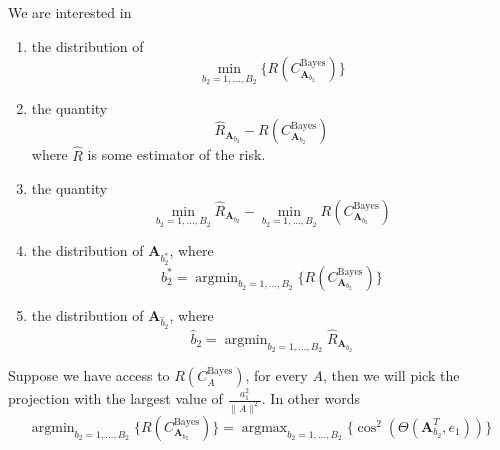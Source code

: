 \documentclass[12pt]{article}
\DeclareMathOperator*{\argmin}{argmin}
\DeclareMathOperator*{\argmax}{argmax}
\begin{document}
We are interested in 
\begin{enumerate} 
\item the distribution of 
\[
\min_{b_2 = 1, \ldots, B_2} \{ R(C_{\mathbf{A}_{b_2}}^{\mathrm{Bayes}})\} 
\]
\item the quantity
\[
\hat{R}_{\mathbf{A}_{b_2}} - R(C_{\mathbf{A}_{b_2}}^{\mathrm{Bayes}})
\]
where $\hat{R}$ is some estimator of the risk. 
\item the quantity
\[
\min_{b_2 = 1, \ldots, B_2} \hat{R}_{\mathbf{A}_{b_2}} - \min_{b_2 = 1, \ldots, B_2} R(C_{\mathbf{A}_{b_2}}^{\mathrm{Bayes}})
\]
\item the distribution of $\mathbf{A}_{b^*_2}$, where 
\[
b^*_2 = \argmin_{b_2 = 1, \ldots, B_2}  \{ R(C_{\mathbf{A}_{b_2}}^{\mathrm{Bayes}})\} 
\]
\item the distribution of $\mathbf{A}_{\hat{b}_2}$, where 
\[
\hat{b}_2 = \argmin_{b_2 = 1, \ldots, B_2} \hat{R}_{\mathbf{A}_{b_2}} 
\]
\end{enumerate} 

Suppose we have access to $R(C_{A}^{\mathrm{Bayes}})$, for every $A$, then we will pick the projection with the largest value of $\frac{a_1^2}{\|A\|^2}$. In other words 
\[
\argmin_{b_2 = 1, \ldots, B_2} \{ R(C_{\mathbf{A}_{b_2}}^{\mathrm{Bayes}})\} = \argmax_{b_2 = 1, \ldots, B_2} \{\cos^2(\Theta(\mathbf{A}_{b_2}^T, e_1))\} 
\]




\end{document}
